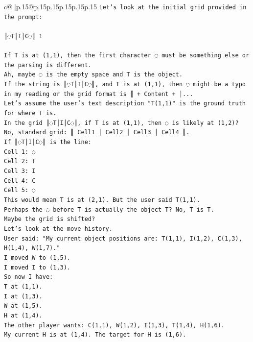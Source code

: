 \documentclass{article}
\begin{document}
{\begin{supertabular}{c@{$\;$}|p{.15\linewidth}@{}p{.15\linewidth}p{.15\linewidth}p{.15\linewidth}p{.15\linewidth}p{.15\linewidth}}
{{{\texttt{Let's look at the initial grid provided in the prompt:} \\
\\ 
\texttt{║◌T│I│C◌║ 1} \\
\\ 
\texttt{If T is at (1,1), then the first character ◌ must be something else or the parsing is different.} \\
\texttt{Ah, maybe ◌ is the empty space and T is the object.} \\
\texttt{If the string is ║◌T│I│C◌║, and T is at (1,1), then ◌ might be a typo in my reading or the grid format is ║ + Content + │...} \\
\texttt{Let's assume the user's text description "T(1,1)" is the ground truth for where T is.} \\
\texttt{In the grid ║◌T│I│C◌║, if T is at (1,1), then ◌ is likely at (1,2)?} \\
\texttt{No, standard grid: ║ Cell1 │ Cell2 │ Cell3 │ Cell4 ║.} \\
\texttt{If ║◌T│I│C◌║ is the line:} \\
\texttt{Cell 1: ◌} \\
\texttt{Cell 2: T} \\
\texttt{Cell 3: I} \\
\texttt{Cell 4: C} \\
\texttt{Cell 5: ◌} \\
\texttt{This would mean T is at (2,1). But the user said T(1,1).} \\
\texttt{Perhaps the ◌ before T is actually the object T? No, T is T.} \\
\texttt{Maybe the grid is shifted?} \\
\texttt{Let's look at the move history.} \\
\texttt{User said: "My current object positions are: T(1,1), I(1,2), C(1,3), H(1,4), W(1,7)."} \\
\texttt{I moved W to (1,5).} \\
\texttt{I moved I to (1,3).} \\
\texttt{So now I have:} \\
\texttt{T at (1,1).} \\
\texttt{I at (1,3).} \\
\texttt{W at (1,5).} \\
\texttt{H at (1,4).} \\
\texttt{The other player wants: C(1,1), W(1,2), I(1,3), T(1,4), H(1,6).} \\
\texttt{My current H is at (1,4). The target for H is (1,6).} \\
}}}
\end{supertabular}}
\end{document}

